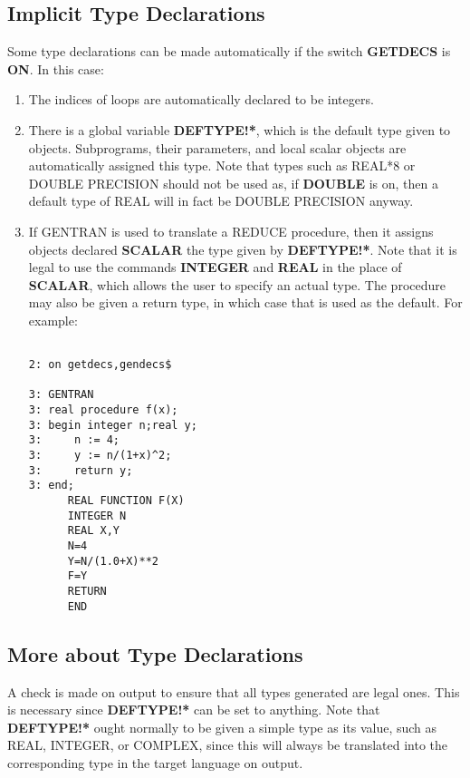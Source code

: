 \subsection{Implicit Type Declarations}
\label{implicit:type} 
Some type  declarations can be made automatically if the switch {\bf GETDECS}
is {\bf ON}.  In this case:
\begin{enumerate}
\item The indices of loops are automatically declared to be integers.
\item There is a global variable {\bf DEFTYPE!*}, which is the default
type given to objects.  Subprograms, their parameters, and local scalar
objects are automatically assigned this type. 
 
Note that types such as REAL*8 or DOUBLE PRECISION should not
be used as, if {\bf DOUBLE} is on, then a default type of REAL
will in fact be DOUBLE PRECISION anyway.
\item  If GENTRAN is used to translate a REDUCE procedure, then it assigns
objects declared {\bf SCALAR} the type given by {\bf DEFTYPE!*}.  Note that
 
it is legal to use the commands {\bf INTEGER} and {\bf REAL} in the place
of {\bf SCALAR}, which allows the user to specify an actual type.  The
procedure may also be given a return type, in which case that is used as
the default.  For example:
\begin{verbatim}

2: on getdecs,gendecs$

3: GENTRAN
3: real procedure f(x);
3: begin integer n;real y;
3:     n := 4;
3:     y := n/(1+x)^2;
3:     return y;
3: end;
      REAL FUNCTION F(X)
      INTEGER N
      REAL X,Y
      N=4
      Y=N/(1.0+X)**2
      F=Y
      RETURN
      END

\end{verbatim}
\end{enumerate}

\subsection{More about Type Declarations}
\label{more:type}
A check is made on output to ensure that all types generated are legal ones.
This is necessary since {\bf DEFTYPE!*} can be set to anything.
Note that {\bf DEFTYPE!*} ought normally to be given a simple 
type as its 
value, such as REAL, INTEGER, or COMPLEX,
since this will always be translated into the corresponding type in the
target language on output.

